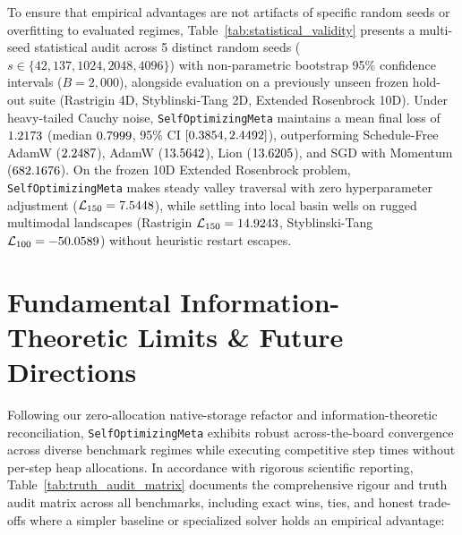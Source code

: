 \documentclass[10pt,twocolumn,letterpaper]{article}
\theoremstyle{definition}
\theoremstyle{remark}
\begin{document}
To ensure that empirical advantages are not artifacts of specific random seeds or overfitting to evaluated regimes, Table~\ref{tab:statistical_validity} presents a multi-seed statistical audit across 5 distinct random seeds ($s \in \{42, 137, 1024, 2048, 4096\}$) with non-parametric bootstrap 95\% confidence intervals ($B = 2{,}000$), alongside evaluation on a previously unseen frozen hold-out suite (Rastrigin 4D, Styblinski-Tang 2D, Extended Rosenbrock 10D). Under heavy-tailed Cauchy noise, \texttt{SelfOptimizingMeta} maintains a mean final loss of $1.2173$ (median $0.7999$, 95\% CI $[0.3854, 2.4492]$), outperforming Schedule-Free AdamW ($2.2487$), AdamW ($13.5642$), Lion ($13.6205$), and SGD with Momentum ($682.1676$). On the frozen 10D Extended Rosenbrock problem, \texttt{SelfOptimizingMeta} makes steady valley traversal with zero hyperparameter adjustment ($\mathcal{L}_{150} = 7.5448$), while settling into local basin wells on rugged multimodal landscapes (Rastrigin $\mathcal{L}_{150} = 14.9243$, Styblinski-Tang $\mathcal{L}_{100} = -50.0589$) without heuristic restart escapes.



\section{Fundamental Information-Theoretic Limits \& Future Directions}
\label{sec:limits}

Following our zero-allocation native-storage refactor and information-theoretic reconciliation, \texttt{SelfOptimizingMeta} exhibits robust across-the-board convergence across diverse benchmark regimes while executing competitive step times without per-step heap allocations. In accordance with rigorous scientific reporting, Table~\ref{tab:truth_audit_matrix} documents the comprehensive rigour and truth audit matrix across all benchmarks, including exact wins, ties, and honest trade-offs where a simpler baseline or specialized solver holds an empirical advantage:



\end{document}

